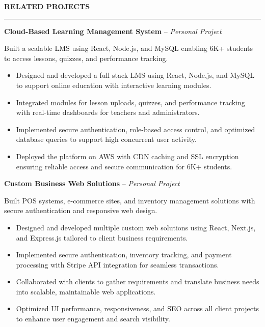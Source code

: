 \documentclass[10pt,letterpaper]{article}
\begin{document}
\vspace{6pt}

\textbf{RELATED PROJECTS}\\[-8pt]
\noindent\rule{\textwidth}{1pt}

\vspace{-2pt}

\textbf{Cloud-Based Learning Management System} -- \emph{Personal Project}

\vspace{-1pt}

Built a scalable LMS using React, Node.js, and MySQL enabling 6K+ students to access lessons, quizzes, and performance tracking.
\vspace{-1pt}
\begin{itemize}
\item Designed and developed a full stack LMS using React, Node.js, and MySQL to support online education with interactive learning modules.
\item Integrated modules for lesson uploads, quizzes, and performance tracking with real-time dashboards for teachers and administrators.
\item Implemented secure authentication, role-based access control, and optimized database queries to support high concurrent user activity.
\item Deployed the platform on AWS with CDN caching and SSL encryption ensuring reliable access and secure communication for 6K+ students.
\end{itemize}

\textbf{Custom Business Web Solutions} -- \emph{Personal Project}

\vspace{-1pt}

Built POS systems, e-commerce sites, and inventory management solutions with secure authentication and responsive web design.
\vspace{-1pt}
\begin{itemize}
\item Designed and developed multiple custom web solutions using React, Next.js, and Express.js tailored to client business requirements.
\item Implemented secure authentication, inventory tracking, and payment processing with Stripe API integration for seamless transactions.
\item Collaborated with clients to gather requirements and translate business needs into scalable, maintainable web applications.
\item Optimized UI performance, responsiveness, and SEO across all client projects to enhance user engagement and search visibility.
\end{itemize}
\end{document}
